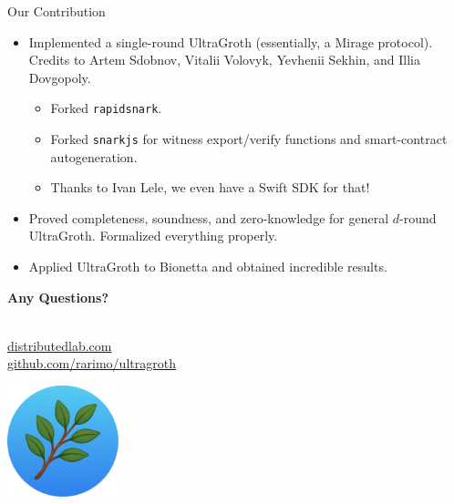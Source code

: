 \documentclass{zkdl-presentation-template}
\begin{document}
\begin{frame}{Our Contribution}
    \begin{itemize}
        \item Implemented a single-round UltraGroth (essentially, a Mirage
        protocol). Credits to Artem Sdobnov, Vitalii Volovyk, Yevhenii 
        Sekhin, and Illia Dovgopoly.
        \begin{itemize}
            \item Forked \texttt{rapidsnark}.
            \item Forked \texttt{snarkjs} for witness export/verify functions
            and smart-contract autogeneration.
            \item Thanks to Ivan Lele, we even have a Swift SDK for that!
        \end{itemize}
        \item Proved completeness, soundness, and zero-knowledge for general
        $d$-round UltraGroth. Formalized everything properly.
        \item Applied UltraGroth to Bionetta and obtained incredible results.
    \end{itemize}
\end{frame}

    \begin{frame}[plain]
        \centering
        \LARGE
        \textbf{Any Questions?} \\
        
        \vspace{0.2cm} \Huge {} \large \\
        
        \vspace{1cm}
  
        \href{https://distributedlab.com/}{\hspace{.325em}distributedlab.com} \\
  
        \href{https://github.com/rarimo/ultragroth}{\hspace{.325em}github.com/rarimo/ultragroth}
        
        \begin{center}
            \includegraphics[width=0.25\textwidth]{logo.png}
        \end{center}
    \end{frame}
\end{document}
